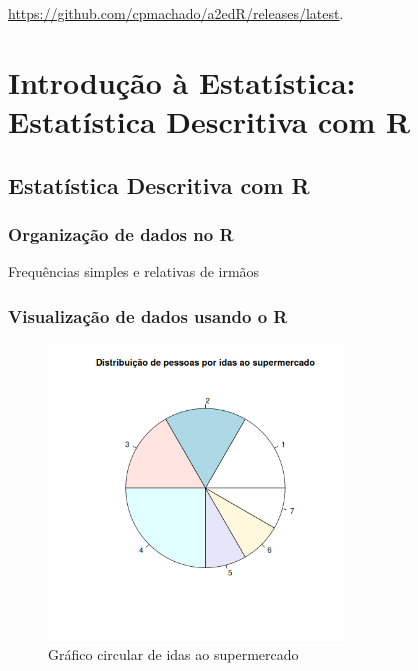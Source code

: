 \documentclass[11pt,a4paper]{report}
\begin{document}
\begin{center}
	\url{https://github.com/cpmachado/a2edR/releases/latest}.
\end{center}


\part{Introdução à Estatística: Estatística Descritiva com R}

\setcounter{chapter}{2}
\chapter{Estatística Descritiva com R}
\section{Organização de dados no R}



\begin{table}[h!]
	\centering
	\caption{Frequências simples e relativas de irmãos}
	\label{tab:3.1}
\end{table}

\clearpage

\section{Visualização de dados usando o R}

\begin{figure}[h!]
	\centering
	\includegraphics[width=0.7\textwidth]{imagem/ieedr/ex3_2.png}
	\caption{Gráfico circular de idas ao supermercado}
\end{figure}

\end{document}
